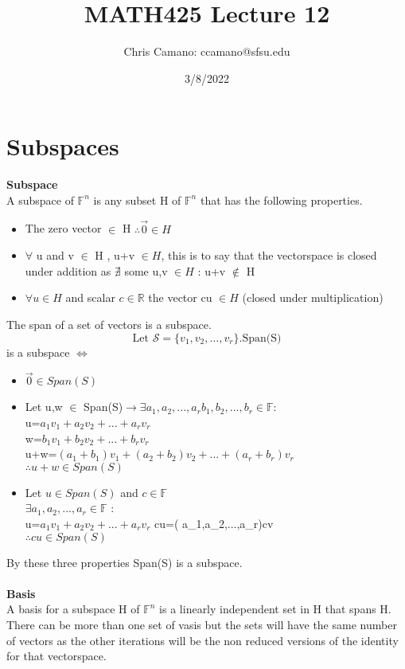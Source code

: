\documentclass[12pt]{article}
\author{Chris Camano: ccamano@sfsu.edu}
\title{MATH425  Lecture 12}
\date{3/8/2022}
\newcommand{\sect}[1]{\section*{#1}}
\newcommand{\R}{\mathbb{R}}
\newcommand{\F}{\mathbb{F}}
\begin{document}
\maketitle

\sect{Subspaces}

\textbf{Subspace} \\
A subspace of $ \F^n$ is any subset H of $\F^n$ that has the following properties.

\begin{itemize}
  \item The zero vector $\in$ H $\therefore \vec{0} \in H$

  \item $\forall$ u and v $\in$ H , u+v $\in H$, this is to say that the vectorspace is closed under addition as $\nexists$ some u,v $\in H$ : u+v $\notin$ H

  \item $\forall u \in H$ and scalar $c \in \R$ the vector cu $\in H$ (closed under multiplication)
\end{itemize}
The span of a set of vectors is a subspace.\\
\[
  \text{Let } \mathcal{S} =\{v_1,v_2,...,v_r\}. \text{Span(S)}
\]
is a subspace $\iff$
\begin{itemize}
  \item $\vec{0}\in Span(S)$
  \item Let u,w $\in$ Span(S)$\rightarrow \exists a_1,a_2,...,a_r b_1,b_2,...,b_r \in \F$: \\
  u=$a_1v_1+a_2v_2+...+a_rv_r$\\
  w=$b_1v_1+b_2v_2+...+b_rv_r$\\
  u+w=$(a_1+b_1)v_1+(a_2+b_2)v_2+...+(a_r+b_r)v_r$\\
  $\therefore u+w \in Span(S)$
  \item Let $u \in Span(S)$ and $c\in \F$ \\
  $\exists a_1,a_2,...,a_r\in \F$ :\\
   u=$a_1v_1+a_2v_2+...+a_rv_r$
   cu=( a_1,a_2,...,a_r)cv\\
   $\therefore cu \in Span(S)$
\end{itemize}
By these three properties Span(S) is a subspace.
\\\\
\textbf{Basis}\\
A basis for a subspace H of $\F^n$ is a linearly independent set in H that spans H. There can be more than one set of vasis but the sets will have the same number of vectors as the other iterations will be the non reduced versions of the identity for that vectorspace.
\end{document}
